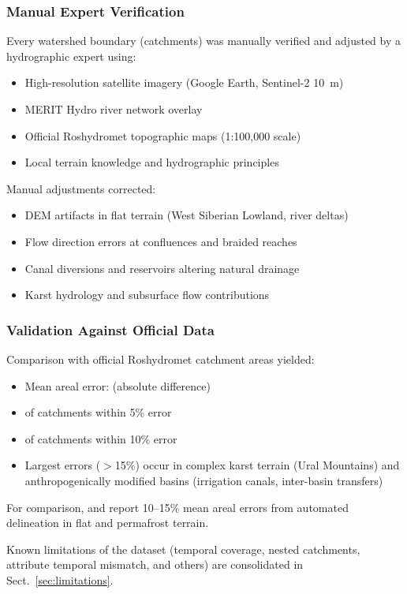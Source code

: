 \subsubsection{Manual Expert Verification}
Every watershed boundary (\ntotal catchments) was manually verified and adjusted by a hydrographic expert using:
\begin{itemize}
    \item High-resolution satellite imagery (Google Earth, Sentinel-2 10~m)
    \item MERIT Hydro river network overlay
    \item Official Roshydromet topographic maps (1:100,000 scale)
    \item Local terrain knowledge and hydrographic principles
\end{itemize}

Manual adjustments corrected:
\begin{itemize}
    \item DEM artifacts in flat terrain (West Siberian Lowland, river deltas)
    \item Flow direction errors at confluences and braided reaches
    \item Canal diversions and reservoirs altering natural drainage
    \item Karst hydrology and subsurface flow contributions
\end{itemize}

\subsubsection{Validation Against Official Data}
Comparison with official Roshydromet catchment areas yielded:
\begin{itemize}
    \item Mean areal error: \meanerror (absolute difference)
    \item \withinfive of catchments within 5\% error
    \item \withinten of catchments within 10\% error
    \item Largest errors ($>$15\%) occur in complex karst terrain (Ural Mountains) and anthropogenically modified basins (irrigation canals, inter-basin transfers)
\end{itemize}

For comparison, \citet{Lehner2008} and \citet{Yamazaki2019} report 10--15\% mean areal errors from automated delineation in flat and permafrost terrain.

Known limitations of the dataset (temporal coverage, nested catchments, attribute temporal mismatch, and others) are consolidated in Sect.~\ref{sec:limitations}.

